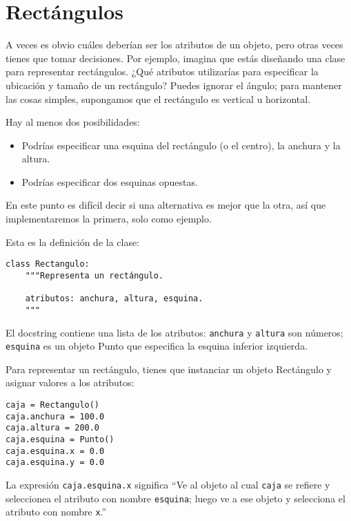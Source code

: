 \documentclass[10pt]{book}
\begin{document}
\section{Rectángulos}
\label{rectangles}

A veces es obvio cuáles deberían ser los atributos de un objeto,
pero otras veces tienes que tomar decisiones.  Por ejemplo, imagina que
estás diseñando una clase para representar rectángulos. ¿Qué atributos
utilizarías para especificar la ubicación y tamaño de un rectángulo?  Puedes
ignorar el ángulo; para mantener las cosas simples, supongamos que el rectángulo es
vertical u horizontal.

Hay al menos dos posibilidades:

\begin{itemize}

\item Podrías especificar una esquina del rectángulo
(o el centro), la anchura y la altura.

\item Podrías especificar dos esquinas opuestas.

\end{itemize}

En este punto es difícil decir si una alternativa es mejor que
la otra, así que implementaremos la primera, solo como ejemplo.

Esta es la definición de la clase:

\begin{verbatim}
class Rectangulo:
    """Representa un rectángulo.

    atributos: anchura, altura, esquina.
    """
\end{verbatim}
%
El docstring contiene una lista de los atributos:  {\tt anchura} y
{\tt altura} son números; {\tt esquina} es un objeto Punto que
especifica la esquina inferior izquierda.

Para representar un rectángulo, tienes que instanciar un objeto Rectángulo
y asignar valores a los atributos:

\begin{verbatim}
caja = Rectangulo()
caja.anchura = 100.0
caja.altura = 200.0
caja.esquina = Punto()
caja.esquina.x = 0.0
caja.esquina.y = 0.0
\end{verbatim}
%
La expresión {\tt caja.esquina.x} significa
``Ve al objeto al cual {\tt caja} se refiere y seleccionea el atributo con nombre
{\tt esquina}; luego ve a ese objeto y selecciona el atributo con nombre
{\tt x}.''
\end{document}
